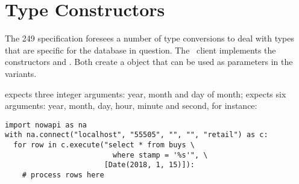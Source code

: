 \section{Type Constructors}
The  249 specification foresees a number
of type conversions to deal with types that are specific
for the database in question.
The \nowdb\ client implements the constructors
 and .
Both create a   object that can be used
as parameters in the  variants.

 expects three integer arguments:
year, month and day of month;
 expects six arguments:
year, month, day, hour, minute and second,
for instance:

\begin{python}
\begin{lstlisting}
import nowapi as na
with na.connect("localhost", "55505", "", "", "retail") as c:
  for row in c.execute("select * from buys \
                         where stamp = '%s'", \
                       [Date(2018, 1, 15)]):
    # process rows here
\end{lstlisting}
\end{python}

